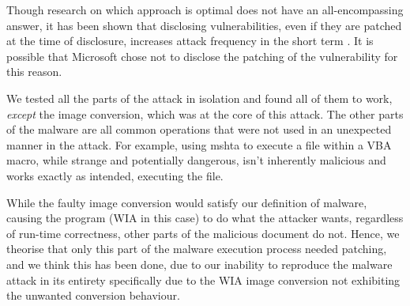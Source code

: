 Though research on which approach is optimal does not have an all-encompassing answer, it has been shown that disclosing 
vulnerabilities, even if they are patched at the time of disclosure, increases attack frequency in the short term 
\cite{vuln-disclosure, vuln-disclosure-impact}. It is possible that Microsoft chose not to disclose the patching of 
the vulnerability for this reason.

We tested all the parts of the attack in isolation and found all of them to work, \emph{except} the image conversion,
which was at the core of this attack. The other parts of the malware are all common operations that were not used in 
an unexpected manner in the attack. For example, using \acrshort{mshta} to execute a file within a \acrshort{VBA} macro,
while strange and potentially dangerous, isn't inherently malicious and works exactly as intended, executing the file.

While the faulty image conversion would satisfy our definition of malware, causing the program (\acrshort{WIA} in this case) 
to do what the attacker wants, regardless of run-time correctness, other parts of the malicious document do not. Hence,
we theorise that only this part of the malware execution process needed patching, and we think this has been done, due
to our inability to reproduce the malware attack in its entirety specifically due to the \acrshort{WIA} image conversion
not exhibiting the unwanted conversion behaviour.

\clearpage

